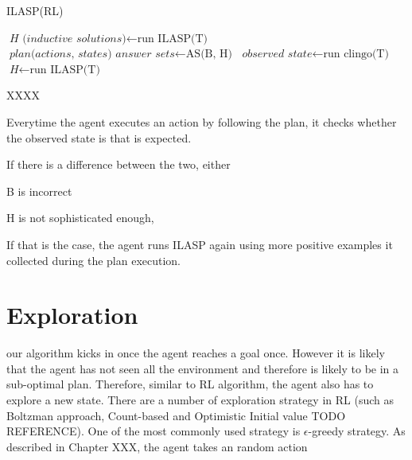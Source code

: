 \begin{algorithm}
\caption{ILASP(RL)}\label{euclid}
\begin{algorithmic}[1]


    \State $\textit{H (inductive solutions)} \gets \text{run ILASP(T)}$
    \State $\textit{plan(actions, states) answer sets} \gets \text{AS(B, H)}$
        \State $\textit{observed state} \gets \text{run clingo(T)}$
            \State $\textit{H} \gets \text{run ILASP(T)}$
            \EndIf
    \EndWhile
\EndWhile

\EndProcedure
\caption{XXXX }
\end{algorithmic}
\end{algorithm}


Everytime the agent executes an action by following the plan, it checks whether the observed state is that is expected. 

If there is a difference between the two, either

B is incorrect

H is not sophisticated enough, 

If that is the case, the agent runs ILASP again using more positive examples it collected during the plan execution. 



\section{Exploration}
\label{exploration}

our algorithm kicks in once the agent reaches a goal once. However it is likely that the agent has not seen all the environment
and therefore is likely to be in a sub-optimal plan. Therefore, similar to RL algorithm, the agent also has to explore a new state. 
There are a number of exploration strategy in RL (such as Boltzman approach, Count-based and Optimistic Initial value TODO REFERENCE). 
One of the most commonly used strategy is $\epsilon$-greedy strategy. As described in Chapter XXX, the agent takes an random action 

